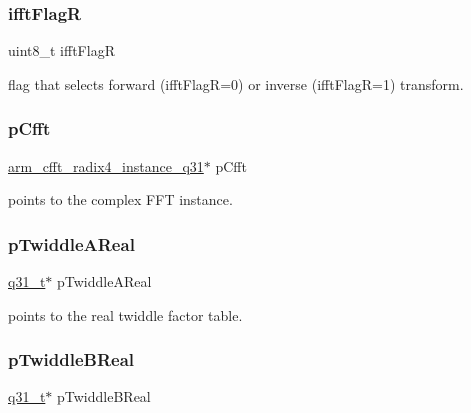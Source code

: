 \subsubsection{\texorpdfstring{ifftFlagR}{ifftFlagR}}
{\footnotesize\ttfamily uint8\+\_\+t ifft\+FlagR}

flag that selects forward (ifft\+FlagR=0) or inverse (ifft\+FlagR=1) transform. \mbox{\label{structarm__rfft__instance__q31_a0b1f4a05c1824bab3b9bd837a260232a}} 
\subsubsection{\texorpdfstring{pCfft}{pCfft}}
{\footnotesize\ttfamily \mbox{\hyperlink{structarm__cfft__radix4__instance__q31}{arm\+\_\+cfft\+\_\+radix4\+\_\+instance\+\_\+q31}}$\ast$ p\+Cfft}

points to the complex F\+FT instance. \mbox{\label{structarm__rfft__instance__q31_a059faa282f9186687d843ead4a7a0d7e}} 
\subsubsection{\texorpdfstring{pTwiddleAReal}{pTwiddleAReal}}
{\footnotesize\ttfamily \mbox{\hyperlink{arm__math_8h_adc89a3547f5324b7b3b95adec3806bc0}{q31\+\_\+t}}$\ast$ p\+Twiddle\+A\+Real}

points to the real twiddle factor table. \mbox{\label{structarm__rfft__instance__q31_a611c385424ce77519f599980f96d5846}} 
\subsubsection{\texorpdfstring{pTwiddleBReal}{pTwiddleBReal}}
{\footnotesize\ttfamily \mbox{\hyperlink{arm__math_8h_adc89a3547f5324b7b3b95adec3806bc0}{q31\+\_\+t}}$\ast$ p\+Twiddle\+B\+Real}

